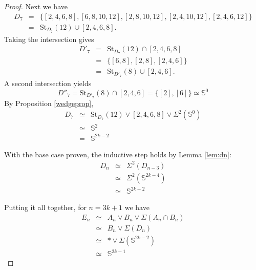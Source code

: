 \documentclass{amsart}
\theoremstyle{definition}
\newcommand{\zs}{{\mathbb S}}
\begin{document}
\begin{proof}
Next we have
\begin{eqnarray*}
    D_7&= &\{[2,4,6,8],[6,8,10,12],[2,8,10,12],[2,4,10,12],[2,4,6,12]\}\\
    &= &\text{St}_{D_7}(12)\cup[2,4,6,8].
\end{eqnarray*}
Taking the intersection gives
\begin{eqnarray*}
D'_7 &= &\text{St}_{D_7}(12)\cap[2,4,6,8] \\
  & = &\{[6,8],[2,8],[2,4,6]\} \\
  & = &\text{St}_{D'_7}(8)\cup[2,4,6].
\end{eqnarray*}
A second intersection yields $$D''_7=\text{St}_{D'_7}(8)\cap[2,4,6]=\{[2],[6]\}\simeq\zs^0$$
By Proposition \ref{wedgeprop}, 
\begin{eqnarray*}
D_7 & \simeq &\text{St}_{D_7}(12)\vee[2,4,6,8]\vee\Sigma^2(\zs^{0}) \\
 &\simeq &\zs^{2} \\
 &= &\zs^{2k-2}
\end{eqnarray*}

With the base case proven, the inductive step holds by Lemma \ref{lem:dn}:
    \begin{eqnarray*}
        D_n &\simeq &\Sigma^2(D_{n-3})\\
        &\simeq &\Sigma^2(\zs^{2k-4})\\
        &\simeq &\zs^{2k-2}
    \end{eqnarray*}

Putting it all together, for $n=3k+1$ we have 
\begin{eqnarray*}
    E_n &\simeq & A_n\vee B_n\vee\Sigma(A_n\cap B_n)\\
    &\simeq & B_n\vee\Sigma(D_n)\\
    &\simeq & \ast\vee\Sigma(\zs^{2k-2})\\
    &\simeq & \zs^{2k-1}
\end{eqnarray*}


\end{proof}
\end{document}
